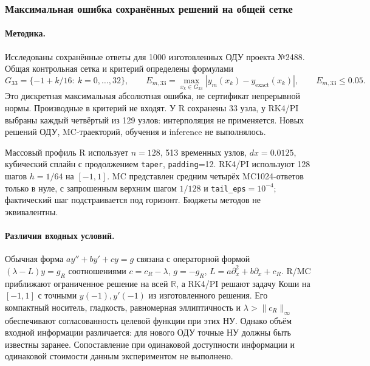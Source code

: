 \subsubsection{Максимальная ошибка сохранённых решений на общей сетке}
\label{sec:grid33final}
\paragraph{Методика.}
Исследованы сохранённые ответы для 1000 изготовленных ОДУ проекта №2488.
Общая контрольная сетка и критерий определены формулами
\[
G_{33}=\{-1+k/16:\ k=0,\ldots,32\},\qquad
E_{m,33}=\max_{x_k\in G_{33}}|y_m(x_k)-y_{\mathrm{exact}}(x_k)|,
\qquad E_{m,33}\le0.05.
\]
Это дискретная максимальная абсолютная ошибка, не сертификат непрерывной
нормы. Производные в критерий не входят. У R сохранены 33 узла, у RK4/PI
выбраны каждый четвёртый из 129 узлов: интерполяция не применяется.
Новых решений ОДУ, MC-траекторий, обучения и inference не выполнялось.

Массовый профиль R использует $n=128$, 513 временных узлов,
$dx=0.0125$, кубический сплайн с продолжением \texttt{taper},
\texttt{padding}=12. RK4/PI используют 128 шагов $h=1/64$ на $[-1,1]$.
MC представлен средним четырёх MC1024-ответов только в нуле, с запрошенным
верхним шагом $1/128$ и \texttt{tail\_eps}$=10^{-4}$; фактический шаг
подстраивается под горизонт. Бюджеты методов не эквивалентны.

\paragraph{Различия входных условий.}
Обычная форма $ay''+by'+cy=g$ связана с операторной формой
$(\lambda-L)y=g_R$ соотношениями $c=c_R-\lambda$, $g=-g_R$,
$L=a\partial_x^2+b\partial_x+c_R$. R/MC приближают ограниченное решение
на всей $\mathbb R$, а RK4/PI решают задачу Коши на $[-1,1]$ с точными
$y(-1),y'(-1)$ из изготовленного решения. Его компактный носитель,
гладкость, равномерная эллиптичность и $\lambda>\|c_R\|_\infty$
обеспечивают согласованность целевой функции при этих НУ.
Однако объём входной информации различается: для нового ОДУ точные НУ
должны быть известны заранее. Сопоставление при одинаковой доступности
информации и одинаковой стоимости данным экспериментом не выполнено.

